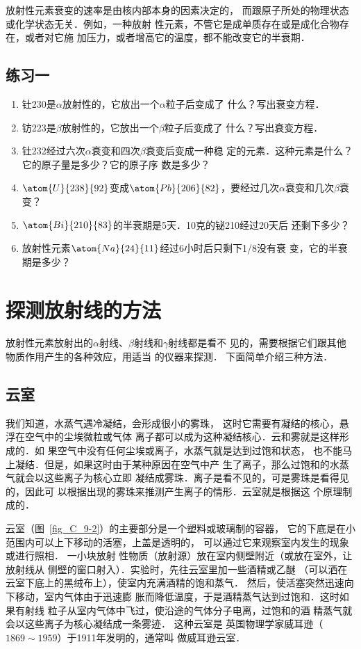放射性元素衰变的速率是由核内部本身的因素决定的，
而跟原子所处的物理状态或化学状态无关．例如，一种放射
性元素，不管它是成单质存在或是成化合物存在，或者对它施
加压力，或者增高它的温度，都不能改变它的半衰期．

\subsection*{练习一}
\begin{enumerate}
    \item 钍230是$\alpha$放射性的，它放出一个$\alpha$粒子后变成了
什么？写出衰变方程．
\item 钫223是$\beta$放射性的，它放出一个$\beta$粒子后变成了
什么？写出衰变方程．
\item 钍232经过六次$\alpha$衰变和四次$\beta$衰变后变成一种稳
定的元素．这种元素是什么？它的原子量是多少？它的原子序
数是多少？
\item 
$\atom{U}{238}{92}$变成$\atom{Pb}{206}{82}$，要经过几次$\alpha$衰变和几次$\beta$衰变？
\item 
$\atom{Bi}{210}{83}$的半衰期是5天．10克的铋210经过20天后
还剩下多少？
\item 放射性元素$\atom{Na}{24}{11}$经过6小时后只剩下1/8没有衰
变，它的半衰期是多少？
\end{enumerate}

\section{探测放射线的方法}
放射性元素放射出的$\alpha$射线、$\beta$射线和$\gamma$射线都是看不
见的，需要根据它们跟其他物质作用产生的各种效应，用适当
的仪器来探测．
下面简单介绍三种方法．

\subsection{云室}
我们知道，水蒸气遇冷凝结，会形成很小的雾珠，
这时它需要有凝结的核心，悬浮在空气中的尘埃微粒或气体
离子都可以成为这种凝结核心．云和雾就是这样形成的．如
果空气中没有任何尘埃或离子，水蒸气就是达到过饱和状态，
也不能马上凝结．但是，如果这时由于某种原因在空气中产
生了离子，那么过饱和的水蒸气就会以这些离子为核心立即
凝结成雾珠．离子是看不见的，可是雾珠是看得见的，因此可
以根据出现的雾珠来推测产生离子的情形．云室就是根据这
个原理制成的．



云室（图~\ref{fig_C_9-2}）的主要部分是一个塑料或玻璃制的容器，
它的下底是在小范围内可以上下移动的活塞，上盖是透明的，
可以通过它来观察室内发生的现象或进行照相．
一小块放射
性物质（放射源）放在室内侧壁附近（或放在室外，让放射线从
侧壁的窗口射入）．实验时，先往云室里加一些酒精或乙醚
（可以洒在云室下底上的黑绒布上），使室内充满酒精的饱和蒸气．
然后，使活塞突然迅速向下移动，室内气体由于迅速膨
胀而降低温度，于是酒精蒸气达到过饱和．这时如果有射线
粒子从室内气体中飞过，使沿途的气体分子电离，过饱和的酒
精蒸气就会以这些离子为核心凝结成一条雾迹．
这种云室是
英国物理学家威耳逊（$1869 \sim 1959$）于1911年发明的，通常叫
做威耳逊云室．

